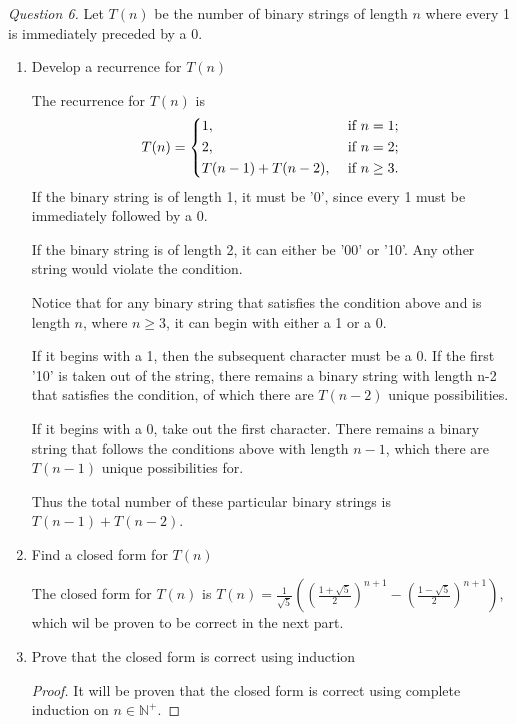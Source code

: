 \documentclass[11pt]{article}
\begin{document}
    \textit{Question 6.} Let \(T(n)\) be the number of binary strings of length \(n\) where every 1 is immediately preceded by a 0.
    \begin{enumerate}[label=(\alph*)]
        \item Develop a recurrence for \(T(n)\)
        
        The recurrence for \(T(n)\) is
        \[
            T(n)=\begin{dcases}
                1, &\text{ if } n=1 ;\\
                2, &\text{ if } n=2 ;\\
                T(n-1) + T(n-2), &\text{ if } n\geq 3.
            \end{dcases}
        \]
        If the binary string is of length 1, it must be '0', since every 1 must be immediately followed by a 0.

        If the binary string is of length 2, it can either be '00' or '10'. Any other string would violate the condition.

        Notice that for any binary string that satisfies the condition above and is length \(n\), where \(n\geq 3\), it can begin with either a 1 or a 0.

        If it begins with a 1, then the subsequent character must be a 0. If the first '10' is taken out of the string, there remains a binary string with length n-2 that satisfies the condition, of which there are \(T(n-2)\) unique possibilities.

        If it begins with a 0, take out the first character. There remains a binary string that follows the conditions above with length \(n-1\), which there are \(T(n-1)\) unique possibilities for.

        Thus the total number of these particular binary strings is \(T(n-1) + T(n-2)\).

        \item Find a closed form for \(T(n)\) 
        
        The closed form for \(T(n)\) is \(T(n)=\frac{1}{\sqrt{5}}\left(\left(\frac{1+\sqrt{5}}{2}\right)^{n+1} - \left(\frac{1-\sqrt{5}}{2}\right)^{n+1}\right)\), which wil be proven to be correct in the next part.

        \item Prove that the closed form is correct using induction
        
        \begin{proof}
            It will be proven that the closed form is correct using complete induction on \(n \in \mathbb{N}^+\).


\end{proof}
\end{enumerate}
\end{document}
